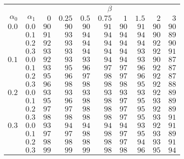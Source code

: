 \begin{tabular}{rr|rrrrrrrr}
\hline\hline
 && \multicolumn{8}{c}{$\beta$}\\
 $\alpha_0$ & $\alpha_1$ & $0$ & $0.25$ & $0.5$ & $0.75$ & $1$ & $1.5$ & $2$ & $3$ \\ 
 \hline
$0.0$ & $0.0$ & $90$ & $90$ & $90$ & $91$ & $90$ & $91$ & $90$ & $90$\\ 
 & $0.1$ & $91$ & $93$ & $94$ & $94$ & $94$ & $94$ & $90$ & $89$\\ 
 & $0.2$ & $92$ & $93$ & $94$ & $94$ & $94$ & $94$ & $92$ & $90$\\ 
 & $0.3$ & $93$ & $93$ & $94$ & $94$ & $94$ & $93$ & $92$ & $91$\\ 
\hline 
 $0.1$ & $0.0$ & $92$ & $93$ & $93$ & $94$ & $94$ & $93$ & $90$ & $87$\\ 
 & $0.1$ & $93$ & $95$ & $96$ & $97$ & $97$ & $96$ & $92$ & $87$\\ 
 & $0.2$ & $95$ & $96$ & $97$ & $98$ & $97$ & $96$ & $92$ & $87$\\ 
 & $0.3$ & $96$ & $98$ & $98$ & $98$ & $98$ & $95$ & $92$ & $88$\\ 
\hline 
 $0.2$ & $0.0$ & $93$ & $93$ & $93$ & $93$ & $93$ & $93$ & $92$ & $89$\\ 
 & $0.1$ & $95$ & $96$ & $98$ & $98$ & $97$ & $95$ & $93$ & $89$\\ 
 & $0.2$ & $97$ & $97$ & $98$ & $98$ & $97$ & $95$ & $92$ & $89$\\ 
 & $0.3$ & $98$ & $98$ & $98$ & $98$ & $97$ & $95$ & $93$ & $91$\\ 
\hline 
 $0.3$ & $0.0$ & $93$ & $94$ & $94$ & $94$ & $94$ & $93$ & $92$ & $91$\\ 
 & $0.1$ & $97$ & $97$ & $98$ & $98$ & $97$ & $95$ & $93$ & $89$\\ 
 & $0.2$ & $98$ & $98$ & $98$ & $98$ & $97$ & $94$ & $93$ & $91$\\ 
 & $0.3$ & $99$ & $99$ & $99$ & $98$ & $98$ & $96$ & $95$ & $94$\\ 
 \hline 
 \end{tabular}